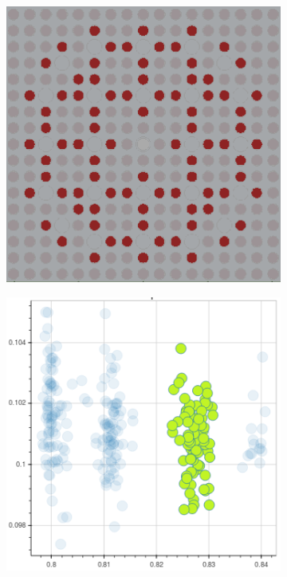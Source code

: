 \clearpage

\begin{figure}[h!]
\centering
\begin{subfigure}{0.45\textwidth}
  \centering
  \includegraphics[width=0.9\linewidth]{figures/unsupervised/features/assm-16/u238-capt/mean-std/geometry-5}
  \caption{}
  \label{fig:chap10-capt-mean-std-geom-4}
\end{subfigure}%
\begin{subfigure}{0.45\textwidth}
  \centering
  \includegraphics[width=0.9\linewidth]{figures/unsupervised/features/assm-16/u238-capt/mean-std/mgxs-5}

\end{subfigure}
\end{figure}
